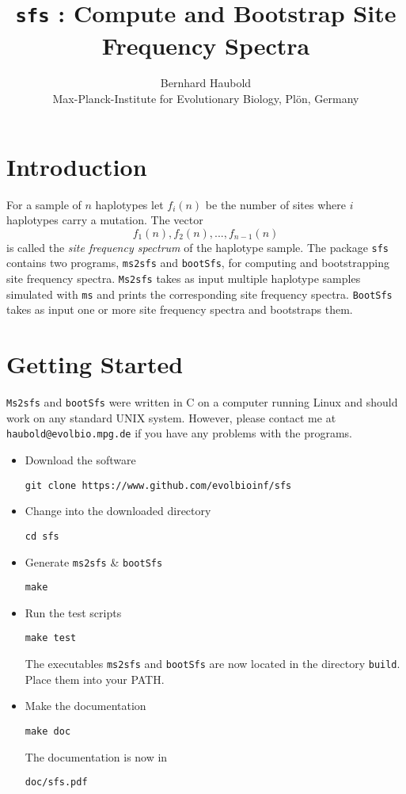 \documentclass[a4paper]{article}
\newcommand{\bi}{\begin{itemize}}
\newcommand{\I}{\item}
\newcommand{\ty}{\texttt}
\begin{document}
\title{\ty{sfs} : Compute and Bootstrap Site Frequency Spectra}
\author{Bernhard Haubold\\\small Max-Planck-Institute for Evolutionary Biology, Pl\"on, Germany}
\maketitle
\section{Introduction}
For a sample of $n$ haplotypes let $f_i(n)$ be the number of sites where $i$
haplotypes carry a mutation. The vector
\[
f_1(n), f_2(n),...,f_{n-1}(n)
\]
is called the \textit{site frequency spectrum} of the haplotype sample. The package \ty{sfs}
contains two programs, \ty{ms2sfs} and \ty{bootSfs}, for computing and bootstrapping
site frequency spectra. \ty{Ms2sfs}
takes as input multiple haplotype samples simulated with \ty{ms}
\citep{hud02:gen} and prints the corresponding site frequency
spectra. \ty{BootSfs} takes as input one or more site frequency spectra and
bootstraps them.
\section{Getting Started}
\ty{Ms2sfs}  and \ty{bootSfs} were written in C on a computer running Linux and should
work on any standard UNIX system.
However, please contact me at \ty{haubold@evolbio.mpg.de} if you have any problems with the programs.
\bi
\I Download the software
\begin{verbatim}
git clone https://www.github.com/evolbioinf/sfs
\end{verbatim}
\I Change into the downloaded directory
\begin{verbatim}
cd sfs
\end{verbatim}
\I Generate \ty{ms2sfs} \& \ty{bootSfs}
\begin{verbatim}
make
\end{verbatim}
\I Run the test scripts
\begin{verbatim}
make test
\end{verbatim}
The executables \ty{ms2sfs} and \ty{bootSfs} are now located in the
directory \ty{build}. Place them into your PATH.
\item Make the documentation
\begin{verbatim}
make doc
\end{verbatim}
The documentation is now in
\begin{verbatim}
doc/sfs.pdf
\end{verbatim}
\end{itemize}
\end{document}
